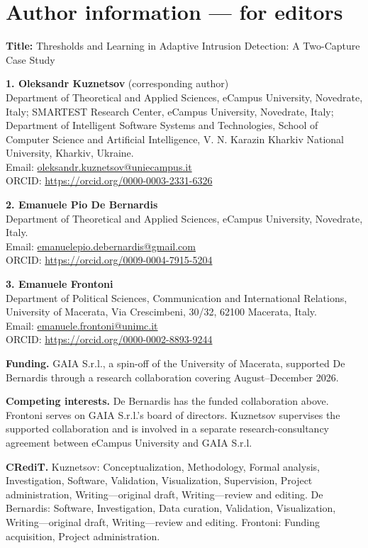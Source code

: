\documentclass[11pt]{article}
\begin{document}
\clearpage
\section*{Author information --- for editors}
\textbf{Title:} Thresholds and Learning in Adaptive Intrusion Detection: A Two-Capture Case Study

\textbf{1. Oleksandr Kuznetsov} (corresponding author)\\
Department of Theoretical and Applied Sciences, eCampus University, Novedrate, Italy; SMARTEST Research Center, eCampus University, Novedrate, Italy; Department of Intelligent Software Systems and Technologies, School of Computer Science and Artificial Intelligence, V. N. Karazin Kharkiv National University, Kharkiv, Ukraine.\\
Email: \href{mailto:oleksandr.kuznetsov@uniecampus.it}{oleksandr.kuznetsov@uniecampus.it}\\
ORCID: \url{https://orcid.org/0000-0003-2331-6326}

\textbf{2. Emanuele Pio De Bernardis}\\
Department of Theoretical and Applied Sciences, eCampus University, Novedrate, Italy.\\
Email: \href{mailto:emanuelepio.debernardis@gmail.com}{emanuelepio.debernardis@gmail.com}\\
ORCID: \url{https://orcid.org/0009-0004-7915-5204}

\textbf{3. Emanuele Frontoni}\\
Department of Political Sciences, Communication and International Relations, University of Macerata, Via Crescimbeni, 30/32, 62100 Macerata, Italy.\\
Email: \href{mailto:emanuele.frontoni@unimc.it}{emanuele.frontoni@unimc.it}\\
ORCID: \url{https://orcid.org/0000-0002-8893-9244}

\textbf{Funding.} GAIA S.r.l., a spin-off of the University of Macerata, supported De Bernardis through a research collaboration covering August--December 2026.

\textbf{Competing interests.} De Bernardis has the funded collaboration above. Frontoni serves on GAIA S.r.l.'s board of directors. Kuznetsov supervises the supported collaboration and is involved in a separate research-consultancy agreement between eCampus University and GAIA S.r.l.

\textbf{CRediT.} Kuznetsov: Conceptualization, Methodology, Formal analysis, Investigation, Software, Validation, Visualization, Supervision, Project administration, Writing---original draft, Writing---review and editing. De Bernardis: Software, Investigation, Data curation, Validation, Visualization, Writing---original draft, Writing---review and editing. Frontoni: Funding acquisition, Project administration.
\end{document}

